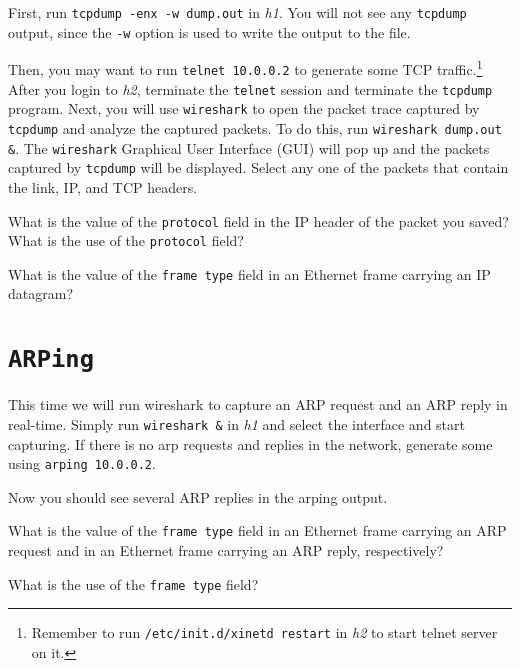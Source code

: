 \documentclass{../UTNetLab}
\begin{document}
    First, run \lstinline{tcpdump -enx -w dump.out} in \textit{h1}.
    You will not see any \lstinline{tcpdump} output, since the \lstinline{-w} option is used to write the output to the  file.

    Then, you may want to run \lstinline{telnet 10.0.0.2} to generate some TCP traffic.\footnote{Remember to run \lstinline{/etc/init.d/xinetd restart} in \textit{h2} to start telnet server on it.}
    After you login to \textit{h2}, terminate the \lstinline{telnet} session and terminate the \lstinline{tcpdump} program.
    Next, you will use \lstinline{wireshark} to open the packet trace captured by \lstinline{tcpdump} and analyze the captured packets.
    To do this, run \lstinline{wireshark dump.out &}.
    The \lstinline{wireshark} Graphical User Interface (GUI) will pop up and the packets captured by \lstinline{tcpdump} will be displayed.
    Select any one of the packets that contain the link, IP, and TCP headers.
    
    \begin{report}
    \item What is the value of the \texttt{protocol} field in the IP header of the packet you saved?
    What is the use of the \texttt{protocol} field?

    \item What is the value of the \texttt{frame type} field in an Ethernet frame carrying an IP datagram?
    \end{report}

\section{\texttt{ARPing}}
    This time we will run wireshark to capture an ARP request and an ARP reply in real-time. Simply run \lstinline{wireshark &} in \textit{h1} and select the interface and start capturing.
    If there is no arp requests and replies in the network, generate some using \lstinline{arping 10.0.0.2}.

    Now you should see several ARP replies in the arping output.
    
    \begin{report}
    \item What is the value of the \texttt{frame type} field in an Ethernet frame carrying an ARP request and in an Ethernet frame carrying an ARP reply, respectively?

    \item What is the use of the \texttt{frame type} field?
    \end{report}
\end{document}
